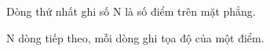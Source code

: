Dòng thứ nhất ghi số N là số điểm trên mặt phẳng.  

   N dòng tiếp theo, mỗi dòng ghi tọa độ của một điểm.  

\